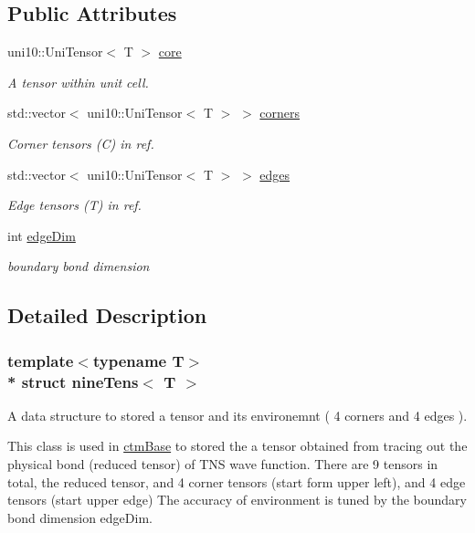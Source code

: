 \subsection*{Public Attributes}
\begin{DoxyCompactItemize}
\item 
uni10\+::\+Uni\+Tensor$<$ T $>$ \hyperlink{structnineTens_ad2611d1189bff9072e6013075f586b78}{core}
\begin{DoxyCompactList}\small\item\em A tensor within unit cell. \end{DoxyCompactList}\item 
std\+::vector$<$ uni10\+::\+Uni\+Tensor$<$ T $>$ $>$ \hyperlink{structnineTens_ace5b2090355a7503925b0e767d836f26}{corners}
\begin{DoxyCompactList}\small\item\em Corner tensors (C) in ref. \end{DoxyCompactList}\item 
std\+::vector$<$ uni10\+::\+Uni\+Tensor$<$ T $>$ $>$ \hyperlink{structnineTens_a4e6679c9e3ca9b919d3ed95587451e74}{edges}
\begin{DoxyCompactList}\small\item\em Edge tensors (T) in ref. \end{DoxyCompactList}\item 
int \hyperlink{structnineTens_a478ce0cba22d1c1392bafc1bb1463609}{edge\+Dim}\hypertarget{structnineTens_a478ce0cba22d1c1392bafc1bb1463609}{}\label{structnineTens_a478ce0cba22d1c1392bafc1bb1463609}

\begin{DoxyCompactList}\small\item\em boundary bond dimension \end{DoxyCompactList}\end{DoxyCompactItemize}


\subsection{Detailed Description}
\subsubsection*{template$<$typename T$>$\\*
struct nine\+Tens$<$ T $>$}

A data structure to stored a tensor and its environemnt ( 4 corners and 4 edges ). 

This class is used in \hyperlink{classctmBase}{ctm\+Base} to stored the a tensor obtained from tracing out the physical bond (reduced tensor) of T\+NS wave function. There are 9 tensors in total, the reduced tensor, and 4 corner tensors (start form upper left), and 4 edge tensors (start upper edge) The accuracy of environment is tuned by the boundary bond dimension edge\+Dim. 

